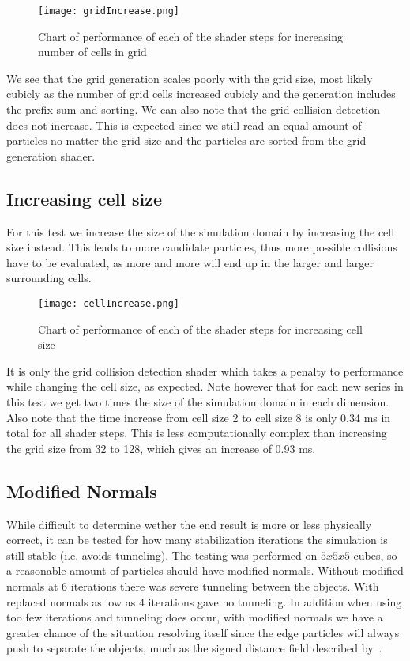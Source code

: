 \begin{figure}[H]
  \centering
  \texttt{[image: gridIncrease.png]}
  \caption{Chart of performance of each of the shader steps for increasing number of cells in grid}
\end{figure}

We see that the grid generation scales poorly with the grid size, most likely cubicly
as the number of grid cells increased cubicly and the generation includes the prefix sum and sorting.
We can also note that the grid collision detection does not increase. This is expected since
we still read an equal amount of particles no matter the grid size and the particles are
sorted from the grid generation shader.

\subsection{Increasing cell size}
For this test we increase the size of the simulation domain by increasing the cell size instead.
This leads to more candidate particles, thus more possible collisions have to be evaluated,
as more and more will end up in
the larger and larger surrounding cells.
\begin{figure}[H]
  \centering
  \texttt{[image: cellIncrease.png]}
  \caption{Chart of performance of each of the shader steps for increasing cell size}
\end{figure}

It is only the grid collision detection shader which takes a penalty to performance
while changing the cell size, as expected. Note however that for each new series
in this test we get two times the size of the simulation domain in each dimension.
Also note that the time increase from cell size 2 to cell size 8 is only 0.34 ms in total for all shader steps.
This is less computationally complex than increasing the grid size from 32 to 128, which gives an increase of 0.93 ms.

\subsection{Modified Normals}\label{sec:resmodnorm}
While difficult to determine wether the end result is more or less physically correct,
it can be tested for how many stabilization iterations the simulation
is still stable (i.e. avoids tunneling). The testing was performed on $5x5x5$
cubes, so a reasonable amount of particles should have modified normals. Without modified
normals at 6 iterations there was severe tunneling between the objects. With replaced normals
 as low as 4 iterations gave no tunneling. In addition when using too few iterations
 and tunneling does occur, with modified normals we have a greater chance of the
 situation resolving itself since the edge particles will always push to separate
 the objects, much as the signed distance field described by~\cite{flex}.

